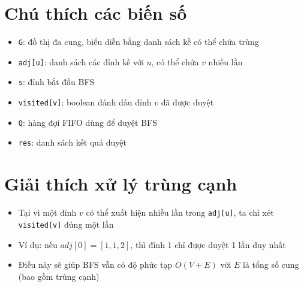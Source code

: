 \documentclass[12pt]{article}
\begin{document}
\section*{Chú thích các biến số}
\begin{itemize}
    \item \texttt{G}: đồ thị đa cung, biểu diễn bằng danh sách kề có thể chứa trùng
    \item \texttt{adj[u]}: danh sách các đỉnh kề với $u$, có thể chứa $v$ nhiều lần
    \item \texttt{s}: đỉnh bắt đầu BFS
    \item \texttt{visited[v]}: boolean đánh dấu đỉnh $v$ đã được duyệt
    \item \texttt{Q}: hàng đợi FIFO dùng để duyệt BFS
    \item \texttt{res}: danh sách kết quả duyệt
\end{itemize}

\section*{Giải thích xử lý trùng cạnh}
\begin{itemize}
    \item Tại vì một đỉnh $v$ có thể xuất hiện nhiều lần trong \texttt{adj[u]}, ta chỉ xét \texttt{visited[v]} đúng một lần
    \item Ví dụ: nếu $adj[0] = [1,1,2]$, thì đỉnh 1 chỉ được duyệt 1 lần duy nhất
    \item Điều này sẽ giúp BFS vẫn có độ phức tạp $O(V + E)$ với $E$ là tổng số cung (bao gồm trùng cạnh)
\end{itemize}
\end{document}
